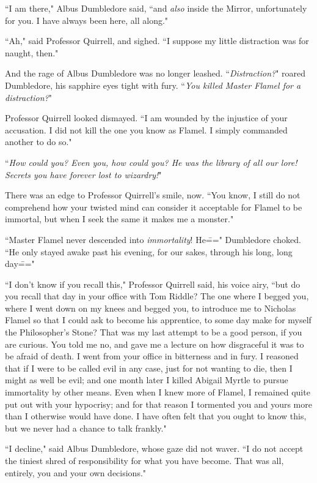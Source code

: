 ``I am there," Albus Dumbledore said, ``and \emph{also} inside the Mirror, unfortunately for you. I have always been here, all along."

``Ah," said Professor Quirrell, and sighed. ``I suppose my little distraction was for naught, then."

And the rage of Albus Dumbledore was no longer leashed. ``\emph{Distraction?}" roared Dumbledore, his sapphire eyes tight with fury. ``\emph{You killed Master Flamel for a distraction?}"

Professor Quirrell looked dismayed. ``I am wounded by the injustice of your accusation. I did not kill the one you know as Flamel. I simply commanded another to do so."

``\emph{How could you? Even you, how could you? He was the library of all our lore! Secrets you have forever lost to wizardry!}"

There was an edge to Professor Quirrell's smile, now. ``You know, I still do not comprehend how your twisted mind can consider it acceptable for Flamel to be immortal, but when I seek the same it makes me a monster."

``Master Flamel never descended into \emph{immortality}! He\===" Dumbledore choked. ``He only stayed awake past his evening, for our sakes, through his long, long day\==="

``I don't know if you recall this," Professor Quirrell said, his voice airy, ``but do you recall that day in your office with Tom Riddle? The one where I begged you, where I went down on my knees and begged you, to introduce me to Nicholas Flamel so that I could ask to become his apprentice, to some day make for myself the Philosopher's Stone? That was my last attempt to be a good person, if you are curious. You told me no, and gave me a lecture on how disgraceful it was to be afraid of death. I went from your office in bitterness and in fury. I reasoned that if I were to be called evil in any case, just for not wanting to die, then I might as well be evil; and one month later I killed Abigail Myrtle to pursue immortality by other means. Even when I knew more of Flamel, I remained quite put out with your hypocrisy; and for that reason I tormented you and yours more than I otherwise would have done. I have often felt that you ought to know this, but we never had a chance to talk frankly."

``I decline," said Albus Dumbledore, whose gaze did not waver. ``I do not accept the tiniest shred of responsibility for what you have become. That was all, entirely, you and your own decisions."

